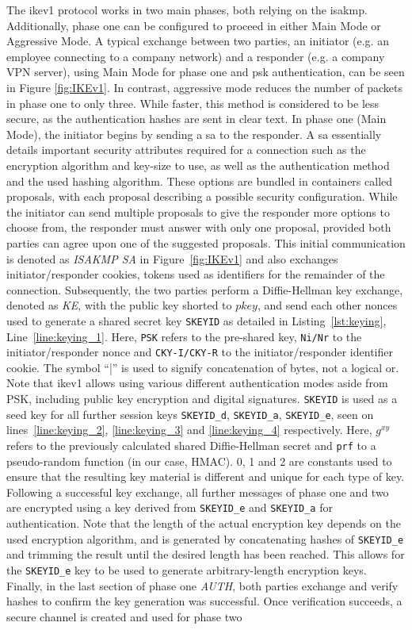 The \ac{ike}v1 protocol works in two main phases, both relying on the \ac{isakmp}. Additionally, phase one can be configured to proceed in either Main Mode or Aggressive Mode. A typical exchange between two parties, an initiator (e.g. an employee connecting to a company network) and a responder (e.g. a company VPN server), using Main Mode for phase one and \ac{psk} authentication, can be seen in Figure \ref{fig:IKEv1}. In contrast, aggressive mode reduces the number of packets in phase one to only three. While faster, this method is considered to be less secure, as the authentication hashes are sent in clear text. In phase one (Main Mode), the initiator begins by sending a \ac{sa} to the responder. A \ac{sa} essentially details important security attributes required for a connection such as the encryption algorithm and key-size to use, as well as the authentication method and the used hashing algorithm. These options are bundled in containers called proposals, with each proposal describing a possible security configuration. While the initiator can send multiple proposals to give the responder more options to choose from, the responder must answer with only one proposal, provided both parties can agree upon one of the suggested proposals. This initial communication is denoted as \emph{ISAKMP SA} in Figure~\ref{fig:IKEv1} and also exchanges initiator/responder cookies, tokens used as identifiers for the remainder of the connection. Subsequently, the two parties perform a Diffie-Hellman key exchange, denoted as \emph{KE}, with the public key shorted to $pkey$, and send each other nonces used to generate a shared secret key \texttt{SKEYID} as detailed in Listing~\ref{lst:keying}, Line~\ref{line:keying_1}. Here, \texttt{PSK} refers to the pre-shared key, \texttt{Ni/Nr} to the initiator/responder nonce and \texttt{CKY-I/CKY-R} to the initiator/responder identifier cookie. The symbol ``|'' is used to signify concatenation of bytes, not a logical or. Note that \ac{ike}v1 allows using various different authentication modes aside from PSK, including public key encryption and digital signatures. \texttt{SKEYID} is used as a seed key for all further session keys \texttt{SKEYID\_d}, \texttt{SKEYID\_a}, \texttt{SKEYID\_e}, seen on lines~\ref{line:keying_2}, \ref{line:keying_3} and \ref{line:keying_4} respectively. Here, $g^{xy}$ refers to the previously calculated shared Diffie-Hellman secret and \texttt{prf} to a pseudo-random function (in our case, HMAC). 0, 1 and 2 are constants used to ensure that the resulting key material is different and unique for each type of key. Following a successful key exchange, all further messages of phase one and two are encrypted using a key derived from \texttt{SKEYID\_e} and \texttt{SKEYID\_a} for authentication. Note that the length of the actual encryption key depends on the used encryption algorithm, and is generated by concatenating hashes of \texttt{SKEYID\_e} and trimming the result until the desired length has been reached. This allows for the \texttt{SKEYID\_e} key to be used to generate arbitrary-length encryption keys. Finally, in the last section of phase one \emph{AUTH}, both parties exchange and verify hashes to confirm the key generation was successful. Once verification succeeds, a secure channel is created and used for phase two 